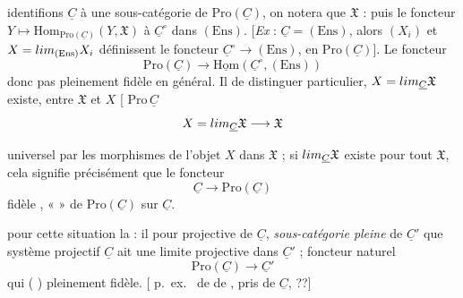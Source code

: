 \documentclass[11pt,a4paper]{article}
\begin{document}
identifions $\underline{C}$ à une sous-catégorie de
$\mathrm{Pro}(\underline{C})$, on notera que $\mathfrak{X}$ 
\emph{ } :  \ill{}
puis  \ill{}  le foncteur
$Y \mapsto \mathrm{Hom}_{\mathrm{Pro}(\underline{C})}(Y, \mathfrak{X})$ à
$\underline{C}^{\circ}$ dans $(\mathrm{Ens})$. [\emph{Ex} :
$\underline{C} = (\mathrm{Ens})$, alors
$(X_i)$ et $X = \varprojlim_{(\mathrm{Ens})} X_i$ définissent le
 foncteur
$\underline{C}^{\circ} \to (\mathrm{Ens})$,  \ill{}
   
 en $\mathrm{Pro}(\underline{C})$]. Le foncteur
\[ \mathrm{Pro}(\underline{C}) \longrightarrow
\underline{\mathrm{Hom}}(\underline{C}^{\circ}, (\mathrm{Ens})) \]
 donc pas pleinement
fidèle en général. Il  de 
distinguer  particulier, 
$X = \varprojlim_{\underline{C}} \mathfrak{X}$ existe, entre
$\mathfrak{X}$ et $X$ [  
  \ill{} \ill{} \ill{}
  $\mathrm{Pro}\,\underline{C}$
\[ X = \varprojlim_{\underline{C}} \mathfrak{X} \longrightarrow \mathfrak{X} \]


universel par les morphismes  de
l'objet $X$ dans $\mathfrak{X}$ ; si $\varprojlim_{\underline{C}} \mathfrak{X}$
existe pour tout $\mathfrak{X}$, cela signifie précisément que le foncteur
\struck{\ill{}}
\[ \underline{C} \longrightarrow \mathrm{Pro}(\underline{C}) \]
  fidèle 
\struck{\ill{}}  , «  »
de $\mathrm{Pro}(\underline{C})$ \struck{\ill{}} sur $\underline{C}$.

 \ill{} \ill{}  pour cette
situation \ill{} la  : \struck{\ill{}} il \ill{}
 pour   projective
de $\underline{C}$,  \ill{} \ill{} \ill{}
\emph{sous-catégorie pleine} \ill{} de $\underline{C}'$ 
que \struck{\ill{}}  système projectif 
$\underline{C}$ ait une limite projective dans \emph{$\underline{C}'$} ;
 \ill{} \ill{}  foncteur naturel
\[ \mathrm{Pro}(\underline{C}) \longrightarrow \underline{C}' \]
qui \emph{} \struck{\ill{}} (\ill{} \ill{} \ill{}
)  pleinement fidèle. [\ill{} \ill{}
\ill{} p.\ ex.\  de  \ill{} de
\ill{} \ill{}, pris  \ill{}  de
$\underline{C}$,   ??]
\end{document}
